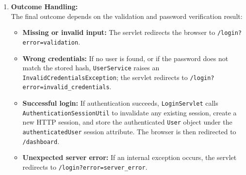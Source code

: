 \begin{enumerate}
    \item \textbf{Outcome Handling:} \\
    The final outcome depends on the validation and password verification result:
    \begin{itemize}
        \item \textbf{Missing or invalid input:} The servlet redirects the browser to \texttt{/login?error=validation}.
        \item \textbf{Wrong credentials:} If no user is found, or if the password does not match the stored hash, \texttt{UserService} raises an \texttt{InvalidCredentialsException}; the servlet redirects to \texttt{/login?error=invalid\_credentials}.
        \item \textbf{Successful login:} If authentication succeeds, \texttt{LoginServlet} calls \texttt{AuthenticationSessionUtil} to invalidate any existing session, create a new HTTP session, and store the authenticated \texttt{User} object under the \texttt{authenticatedUser} session attribute. The browser is then redirected to \texttt{/dashboard}.
        \item \textbf{Unexpected server error:} If an internal exception occurs, the servlet redirects to \texttt{/login?error=server\_error}.
    \end{itemize}
\end{enumerate}
